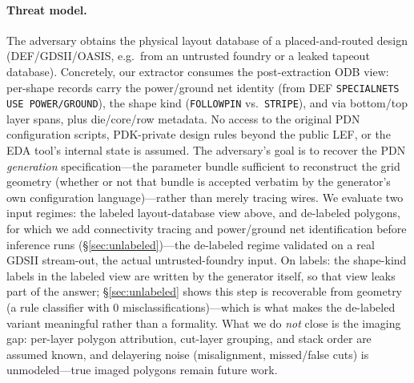 \documentclass[11pt]{article}
\begin{document}
\paragraph{Threat model.} The adversary obtains the physical layout
database of a placed-and-routed design (DEF/GDSII/OASIS, e.g.\ from an
untrusted foundry or a leaked tapeout database).  Concretely, our
extractor consumes the post-extraction ODB view: per-shape records carry
the power/ground net identity (from DEF \texttt{SPECIALNETS}
\texttt{USE POWER/GROUND}), the shape kind (\texttt{FOLLOWPIN} vs.\
\texttt{STRIPE}), and via bottom/top layer spans, plus die/core/row
metadata.  No access to the original PDN configuration scripts,
PDK-private design rules beyond the public LEF, or the EDA tool's
internal state is assumed.  The adversary's goal is to recover the PDN
\emph{generation} specification---the parameter bundle sufficient to
reconstruct the grid geometry (whether or not that bundle is accepted
verbatim by the generator's own configuration language)---rather than
merely tracing wires.  We evaluate two input regimes: the labeled
layout-database view above, and de-labeled polygons, for which we add
connectivity tracing and power/ground net identification before
inference runs (\S\ref{sec:unlabeled})---the de-labeled regime
validated on a real GDSII stream-out, the actual untrusted-foundry
input.  On labels: the shape-kind labels in the labeled view are written
by the generator itself, so that view leaks part of the answer;
\S\ref{sec:unlabeled}
shows this step is recoverable from geometry (a rule
classifier with 0 misclassifications)---which is what makes the
de-labeled variant meaningful rather than a formality.  What we do
\emph{not} close is the imaging gap: per-layer polygon attribution,
cut-layer grouping, and stack order are assumed known, and delayering
noise (misalignment, missed/false cuts) is unmodeled---true imaged
polygons remain future work.
\end{document}
